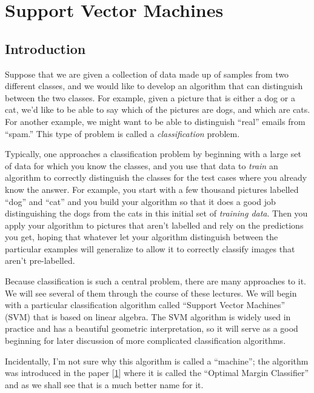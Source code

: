 \documentclass[
]{article}
\author{}
\date{}
\begin{document}
\hypertarget{support-vector-machines}{%
\section{Support Vector Machines}\label{support-vector-machines}}

\hypertarget{introduction}{%
\subsection{Introduction}\label{introduction}}

Suppose that we are given a collection of data made up of samples from
two different classes, and we would like to develop an algorithm that
can distinguish between the two classes. For example, given a picture
that is either a dog or a cat, we'd like to be able to say which of the
pictures are dogs, and which are cats. For another example, we might
want to be able to distinguish ``real'' emails from ``spam.'' This type
of problem is called a \emph{classification} problem.

Typically, one approaches a classification problem by beginning with a
large set of data for which you know the classes, and you use that data
to \emph{train} an algorithm to correctly distinguish the classes for
the test cases where you already know the answer. For example, you start
with a few thousand pictures labelled ``dog'' and ``cat'' and you build
your algorithm so that it does a good job distinguishing the dogs from
the cats in this initial set of \emph{training data}. Then you apply
your algorithm to pictures that aren't labelled and rely on the
predictions you get, hoping that whatever let your algorithm distinguish
between the particular examples will generalize to allow it to correctly
classify images that aren't pre-labelled.

Because classification is such a central problem, there are many
approaches to it. We will see several of them through the course of
these lectures. We will begin with a particular classification algorithm
called ``Support Vector Machines'' (SVM) that is based on linear
algebra. The SVM algorithm is widely used in practice and has a
beautiful geometric interpretation, so it will serve as a good beginning
for later discussion of more complicated classification algorithms.

Incidentally, I'm not sure why this algorithm is called a ``machine'';
the algorithm was introduced in the paper
{[}\protect\hyperlink{ref-vapnik92}{1}{]} where it is called the
``Optimal Margin Classifier'' and as we shall see that is a much better
name for it.
\end{document}
